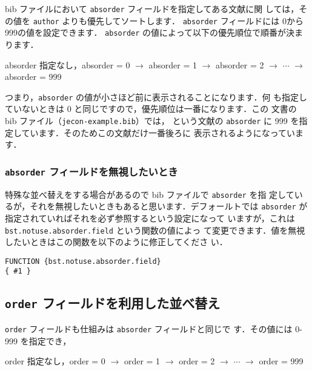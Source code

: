 \documentclass[a4j,10pt]{jarticle}
\begin{document}
bib ファイルにおいて \texttt{absorder} フィールドを指定してある文献に関
しては，その値を \texttt{author} よりも優先してソートします．
\texttt{absorder} フィールドには 0から999の値を設定できます．
\texttt{absorder} の値によって以下の優先順位で順番が決まります．

\begin{screen}
 \begin{center}
 absorder 指定なし，absorder = 0  $\rightarrow$ absorder = 1 $\rightarrow$ absorder = 2
 $\rightarrow$ $\cdots$ $\rightarrow$ absorder = 999
 \end{center}
\end{screen}

つまり，\texttt{absorder} の値が小さほど前に表示されることになります．何
も指定していないときは 0 と同じですので，優先順位は一番になります．この
文書の bib ファイル（\texttt{jecon-example.bib}）では，
\citet{takeda06:_cge_analy_welfar_effec_trade} という文献の
\texttt{absorder} に 999 を指定しています．そのためこの文献だけ一番後ろに
表示されるようになっています．


\subsubsection{\texttt{absorder} フィールドを無視したいとき}

特殊な並べ替えをする場合があるので bib ファイルで \texttt{absorder} を指
定しているが，それを無視したいときもあると思います．デフォールトでは 
\texttt{absorder} が指定されていればそれを必ず参照するという設定になって
いますが，これは \texttt{bst.notuse.absorder.field} という関数の値によっ
て変更できます．値を無視したいときはこの関数を以下のように修正してくださ
い．
\begin{screen}
\begin{verbatim}
FUNCTION {bst.notuse.absorder.field}
{ #1 }
\end{verbatim}
\end{screen}

\subsection{\texttt{order} フィールドを利用した並べ替え}

\texttt{order} フィールドも仕組みは \texttt{absorder} フィールドと同じで
す．その値には 0-999 を指定でき，

\begin{screen}
 \begin{center}
 order 指定なし，order = 0  $\rightarrow$ order = 1 $\rightarrow$ order = 2
 $\rightarrow$ $\cdots$ $\rightarrow$ order = 999
 \end{center}
\end{screen}
\end{document}
